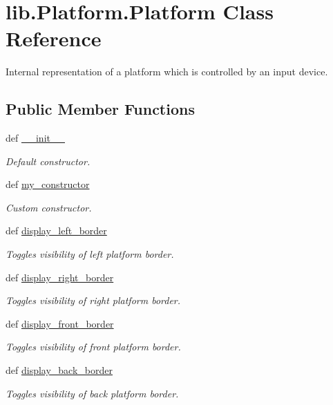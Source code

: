 \hypertarget{classlib_1_1Platform_1_1Platform}{\section{lib.\-Platform.\-Platform \-Class \-Reference}
\label{classlib_1_1Platform_1_1Platform}
}


\-Internal representation of a platform which is controlled by an input device.  


\subsection*{\-Public \-Member \-Functions}
\begin{DoxyCompactItemize}
\item 
def \hyperlink{classlib_1_1Platform_1_1Platform_a5e8bf2029ed62493ffbbf0f88c83dcbd}{\-\_\-\-\_\-init\-\_\-\-\_\-}
\begin{DoxyCompactList}\small\item\em \-Default constructor. \end{DoxyCompactList}\item 
def \hyperlink{classlib_1_1Platform_1_1Platform_a87933b4501d999c83f95ef06b03ade4c}{my\-\_\-constructor}
\begin{DoxyCompactList}\small\item\em \-Custom constructor. \end{DoxyCompactList}\item 
def \hyperlink{classlib_1_1Platform_1_1Platform_adaa77b8b5b09f31af62d9db6028b8a66}{display\-\_\-left\-\_\-border}
\begin{DoxyCompactList}\small\item\em \-Toggles visibility of left platform border. \end{DoxyCompactList}\item 
def \hyperlink{classlib_1_1Platform_1_1Platform_a081033b2c3c69e5a8209d3a80ab27ecc}{display\-\_\-right\-\_\-border}
\begin{DoxyCompactList}\small\item\em \-Toggles visibility of right platform border. \end{DoxyCompactList}\item 
def \hyperlink{classlib_1_1Platform_1_1Platform_a301e6ee8164976f423617148ce60192d}{display\-\_\-front\-\_\-border}
\begin{DoxyCompactList}\small\item\em \-Toggles visibility of front platform border. \end{DoxyCompactList}\item 
def \hyperlink{classlib_1_1Platform_1_1Platform_a8b44cbc4a6a55224c26446e7ee9068ba}{display\-\_\-back\-\_\-border}
\begin{DoxyCompactList}\small\item\em \-Toggles visibility of back platform border. \end{DoxyCompactList}\end{DoxyCompactItemize}
